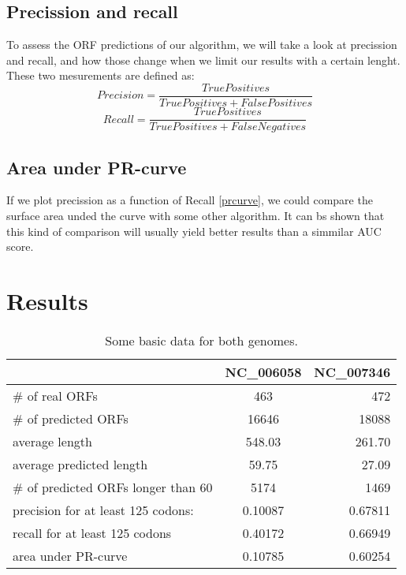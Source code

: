 \documentclass[a4paper,11pt]{article}
\begin{document}
\subsection{Precission and recall}
To assess the ORF predictions of our algorithm, we will take a look at precission and recall, and how those change when we limit our results with a certain lenght. These two mesurements are defined as:
\[
    Precision = \frac{TruePositives }{TruePositives + FalsePositives}
\]
\[
    Recall = \frac{TruePositives }{TruePositives + FalseNegatives}
\]

\subsection{Area under PR-curve}

If we plot precission as a function of Recall \ref{prcurve}, we could compare the surface area unded the curve with some other algorithm. It can bs shown that this kind of comparison will usually yield better results than a simmilar AUC score. 


\section{Results}


\begin{table}[htbp]
    \caption{Some basic data for both genomes.}
    \label{tab1}
    \begin{center}
        \begin{tabular}{ l | c | r }
            \hline                        
            & NC\_006058 & NC\_007346 \\
            \hline                        
            \# of real ORFs & 463 & 472 \\
            \hline                        
            \# of predicted ORFs & 16646 & 18088 \\
            \hline                        
            average length & 548.03 & 261.70 \\
            \hline  
            average predicted length & 59.75 & 27.09 \\
            \hline  
            \# of predicted ORFs longer than 60 & 5174 & 1469 \\
            \hline  
            precision for at least 125 codons: & 0.10087 & 0.67811 \\
            \hline  
            recall for at least 125 codons & 0.40172 & 0.66949 \\
            \hline  
            area under PR-curve & 0.10785 & 0.60254 \\
            \hline  

        \end{tabular}
    \end{center}
\end{table}
\end{document}

